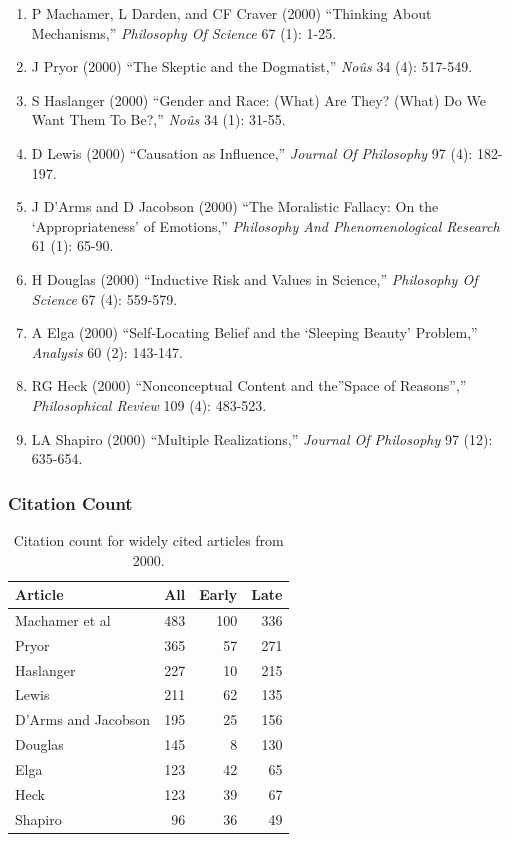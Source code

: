 \documentclass[
  10pt,
  letterpaper,
  DIV=11,
  numbers=noendperiod,
  twoside]{scrartcl}
\providecommand{\tightlist}{%
  \setlength{\itemsep}{0pt}\setlength{\parskip}{0pt}}\usepackage{longtable,booktabs,array}
\begin{document}
\begin{enumerate}
\def\labelenumi{\arabic{enumi}.}
\tightlist
\item
  P Machamer, L Darden, and CF Craver (2000) ``Thinking About
  Mechanisms,'' \emph{Philosophy Of Science} 67 (1): 1-25.
\item
  J Pryor (2000) ``The Skeptic and the Dogmatist,'' \emph{Noûs} 34 (4):
  517-549.
\item
  S Haslanger (2000) ``Gender and Race: (What) Are They? (What) Do We
  Want Them To Be?,'' \emph{Noûs} 34 (1): 31-55.
\item
  D Lewis (2000) ``Causation as Influence,'' \emph{Journal Of
  Philosophy} 97 (4): 182-197.
\item
  J D'Arms and D Jacobson (2000) ``The Moralistic Fallacy: On the
  `Appropriateness' of Emotions,'' \emph{Philosophy And Phenomenological
  Research} 61 (1): 65-90.
\item
  H Douglas (2000) ``Inductive Risk and Values in Science,''
  \emph{Philosophy Of Science} 67 (4): 559-579.
\item
  A Elga (2000) ``Self-Locating Belief and the `Sleeping Beauty'
  Problem,'' \emph{Analysis} 60 (2): 143-147.
\item
  RG Heck (2000) ``Nonconceptual Content and the''Space of Reasons'',''
  \emph{Philosophical Review} 109 (4): 483-523.
\item
  LA Shapiro (2000) ``Multiple Realizations,'' \emph{Journal Of
  Philosophy} 97 (12): 635-654.
\end{enumerate}

\subsubsection*{Citation Count}\label{sec-count-2000}

\begin{longtable}[]{@{}lrrr@{}}

\caption{\label{tbl-citation-count-2000}Citation count for widely cited
articles from 2000.}

\tabularnewline

\toprule\noalign{}
Article & All & Early & Late \\
\midrule\noalign{}
\endhead
\bottomrule\noalign{}
\endlastfoot
Machamer et al & 483 & 100 & 336 \\
Pryor & 365 & 57 & 271 \\
Haslanger & 227 & 10 & 215 \\
Lewis & 211 & 62 & 135 \\
D'Arms and Jacobson & 195 & 25 & 156 \\
Douglas & 145 & 8 & 130 \\
Elga & 123 & 42 & 65 \\
Heck & 123 & 39 & 67 \\
Shapiro & 96 & 36 & 49 \\

\end{longtable}
\end{document}
